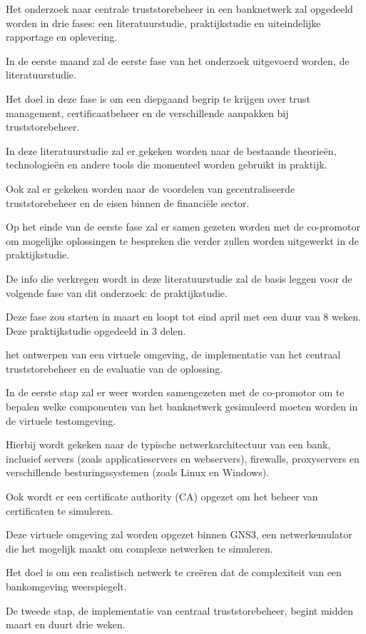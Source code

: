 Het onderzoek naar centrale truststorebeheer in een banknetwerk zal opgedeeld worden in drie fases: een literatuurstudie, praktijkstudie en uiteindelijke rapportage en oplevering.

In de eerste maand zal de eerste fase van het onderzoek uitgevoerd worden, de literatuurstudie.

Het doel in deze fase is om een diepgaand begrip te krijgen over trust management, certificaatbeheer en de verschillende aanpakken bij truststorebeheer.

In deze literatuurstudie zal er gekeken worden naar de bestaande theorieën, technologieën en andere tools die momenteel worden gebruikt in praktijk.

Ook zal er gekeken worden naar de voordelen van gecentraliseerde truststorebeheer en de eisen binnen de financiële sector.

Op het einde van de eerste fase zal er samen gezeten worden met de co-promotor om mogelijke oplossingen te bespreken die verder zullen worden uitgewerkt in de praktijkstudie.

De info die verkregen wordt in deze literatuurstudie zal de basis leggen voor de volgende fase van dit onderzoek: de praktijkstudie.

Deze fase zou starten in maart en loopt tot eind april met een duur van 8 weken. Deze praktijkstudie opgedeeld in 3 delen.

het ontwerpen van een virtuele omgeving, de implementatie van het centraal truststorebeheer en de evaluatie van de oplossing.

In de eerste stap zal er weer worden samengezeten met de co-promotor om te bepalen welke componenten van het banknetwerk gesimuleerd moeten worden in de virtuele testomgeving.

Hierbij wordt gekeken naar de typische netwerkarchitectuur van een bank, inclusief servers (zoals applicatieservers en webservers), firewalls, proxyservers en verschillende besturingssystemen (zoals Linux en Windows).

Ook wordt er een certificate authority (CA) opgezet om het beheer van certificaten te simuleren.

Deze virtuele omgeving zal worden opgezet binnen GNS3, een netwerkemulator die het mogelijk maakt om complexe netwerken te simuleren.

Het doel is om een realistisch netwerk te creëren dat de complexiteit van een bankomgeving weerspiegelt.

De tweede stap, de implementatie van centraal truststorebeheer, begint midden maart en duurt drie weken.

